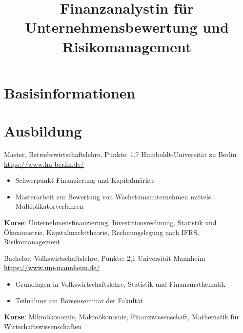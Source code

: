 \documentclass[a4paper, serif, 10pt]{moderncv}
\title{Finanzanalystin für Unternehmensbewertung und Risikomanagement}
\begin{document}
\maketitle

\section{Basisinformationen}

\section{Ausbildung}

        {Master, Betriebswirtschaftslehre, Punkte: 1,7}
        {Humboldt-Universität zu Berlin}
        {\url{https://www.hu-berlin.de/}}
        {}
        {\begin{itemize}
\item Schwerpunkt Finanzierung und Kapitalmärkte
\item Masterarbeit zur Bewertung von Wachstumsunternehmen mittels Multiplikatorverfahren
\end{itemize}
\textbf{Kurse}: Unternehmensfinanzierung, Investitionsrechnung, Statistik und Ökonometrie, Kapitalmarkttheorie, Rechnungslegung nach IFRS, Risikomanagement}

        {Bachelor, Volkswirtschaftslehre, Punkte: 2,1}
        {Universität Mannheim}
        {\url{https://www.uni-mannheim.de/}}
        {}
        {\begin{itemize}
\item Grundlagen in Volkswirtschaftslehre, Statistik und Finanzmathematik
\item Teilnahme am Börsenseminar der Fakultät
\end{itemize}
\textbf{Kurse}: Mikroökonomie, Makroökonomie, Finanzwissenschaft, Mathematik für Wirtschaftswissenschaften}
\end{document}
